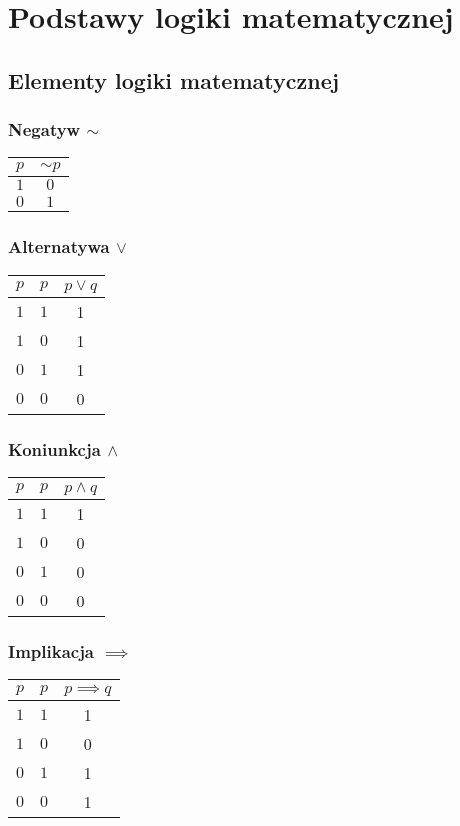 \documentclass[../Matematyka.tex]{subfiles}
\begin{document}
    \section{Podstawy logiki matematycznej}

    \subsection{Elementy logiki matematycznej}

    \subsubsection*{Negatyw \(\sim\)}
    \begin{tabular}{c|c}
        \(p\) & \(\sim \! p\) \\
        \hline
        \(1\) & \(0\) \\
        \(0\) & \(1\) \\
    \end{tabular}

    \subsubsection*{Alternatywa \(\lor\)}
    \begin{tabular}{ccc}
        \(p\) & \(p\) & \(p \lor q\) \\
        \hline
        \(1\) & \(1\) & 1 \\
        \(1\) & \(0\) & 1 \\
        \(0\) & \(1\) & 1 \\
        \(0\) & \(0\) & 0 \\
    \end{tabular}

    \subsubsection*{Koniunkcja \(\land\)}
    \begin{tabular}{c|c|c}
        \(p\) & \(p\) & \(p \land q\) \\
        \hline
        \(1\) & \(1\) & 1 \\
        \(1\) & \(0\) & 0 \\
        \(0\) & \(1\) & 0 \\
        \(0\) & \(0\) & 0 \\
    \end{tabular}

    \subsubsection*{Implikacja \(\implies\)}
    \begin{tabular}{c|c|c}
        \(p\) & \(p\) & \(p \implies q\) \\
        \hline
        \(1\) & \(1\) & 1 \\
        \(1\) & \(0\) & 0 \\
        \(0\) & \(1\) & 1 \\
        \(0\) & \(0\) & 1 \\
    \end{tabular}
\end{document}
